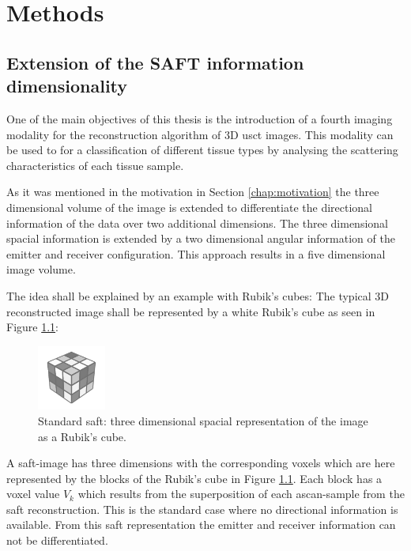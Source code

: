 \chapter{Methods}
\label{chap:methods}

\section{Extension of the SAFT information dimensionality}

\label{chap:SAFT_Augment}
One of the main objectives of this thesis is the introduction of a fourth imaging modality for the reconstruction algorithm of 3D \ac{usct} images. This modality can be used to for a classification of different tissue types by analysing the scattering characteristics of each tissue sample. 

As it was mentioned in the motivation in Section \ref{chap:motivation} the three dimensional volume of the image is extended to differentiate the directional information of the data over two additional dimensions. The three dimensional spacial information is extended by a two dimensional angular information of the emitter and receiver configuration. This approach results in a five dimensional image volume. 

The idea shall be explained by an example with Rubik's cubes:
The typical 3D reconstructed image shall be represented by a white Rubik's cube as seen in Figure \ref{3D_rubics}:
\begin{figure}[H]
    \centering
    \includegraphics[width=0.2\textwidth]{Graphics/rubicscube.png}
    \caption{Standard \ac{saft}: three dimensional spacial representation of the image as a Rubik's cube.}
    \label{3D_rubics}
\end{figure}

A \ac{saft}-image has three dimensions with the corresponding voxels which are here represented by the blocks of the Rubik's cube in Figure \ref{3D_rubics}. Each block has a voxel value $V_k$ which results from the superposition of each \ac{ascan}-sample from the \ac{saft} reconstruction. This is the standard case where no directional information is available. From this \ac{saft} representation the emitter and receiver information can not be differentiated.

